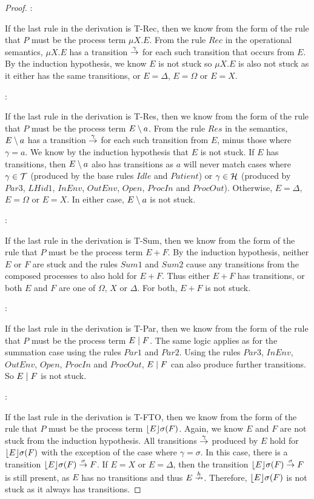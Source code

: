 \begin{proof}
:

\noindent If the last rule in the derivation is T-Rec, then we know
from the form of the rule that $P$ must be the process term $\mu X.E$.
From the rule $Rec$ in the operational semantics, $\mu X.E$ has a
transition $\stackrel{\gamma}{\rightarrow}$ for each such transition that occurs
from $E$.  By the induction hypothesis, we know $E$ is not stuck so
$\mu X.E$ is also not stuck as it either has the same transitions, or
$E = \Delta$, $E = \Omega$ or $E = X$.

:

\noindent If the last rule in the derivation is T-Res, then we know
from the form of the rule that $P$ must be the process term $E
\setminus {a}$.  From the rule $Res$ in the semantics, $E \setminus {a}$ has a
transition $\stackrel{\gamma}{\rightarrow}$ for each such transition from $E$, minus
those where $\gamma = a$.  We know by the induction hypothesis that
$E$ is not stuck.  If $E$ has transitions, then $E \setminus {a}$ also has
transitions as $a$ will never match cases where $\gamma \in \text{$\mathcal{T}$}$
(produced by the base rules $Idle$ and $Patient$) or $\gamma \in
\text{$\mathcal{H}$}$ (produced by $Par3$, $LHid1$, $InEnv$, $OutEnv$, $Open$,
$ProcIn$ and $ProcOut$).  Otherwise, $E = \Delta$, $E = \Omega$ or $E
= X$.  In either case, $E \setminus {a}$ is not stuck.

:

\noindent If the last rule in the derivation is T-Sum, then we know
from the form of the rule that $P$ must be the process term $E + F$.
By the induction hypothesis, neither $E$ or $F$ are stuck and the
rules $Sum1$ and $Sum2$ cause any transitions from the composed
processes to also hold for $E + F$.  Thus either $E + F$ has
transitions, or both $E$ and $F$ are one of $\Omega$, $X$ or $\Delta$.
For both, $E + F$ is not stuck.

:

\noindent If the last rule in the derivation is T-Par, then we know
from the form of the rule that $P$ must be the process term $E \;|\; F$.
The same logic applies as for the summation case using the rules
$Par1$ and $Par2$.  Using the rules $Par3$, $InEnv$, $OutEnv$, $Open$,
$ProcIn$ and $ProcOut$, $E \;|\; F$ can also produce further
transitions.  So $E \;|\; F$ is not stuck.

:

\noindent If the last rule in the derivation is T-FTO, then we know
from the form of the rule that $P$ must be the process term
$\lfloor{E}\rfloor {\sigma} ({F})$.  Again, we know $E$ and $F$ are not stuck
from the induction hypothesis.  All transitions $\stackrel{\gamma}{\rightarrow}$
produced by $E$ hold for $\lfloor{E}\rfloor {\sigma} ({F})$ with the exception
of the case where $\gamma = \sigma$.  In this case, there is a
transition $\lfloor{E}\rfloor {\sigma} ({F}) \stackrel{\sigma}{\rightarrow} F$.  If $E = X$ or
$E = \Delta$, then the transition $\lfloor{E}\rfloor {\sigma} ({F})
\stackrel{\sigma}{\rightarrow} F$ is still present, as $E$ has no transitions and
thus $E \stackrel{h}{\nrightarrow}$.  Therefore, $\lfloor{E}\rfloor {\sigma} ({F})$ is not
stuck as it always has transitions.


\end{proof}
